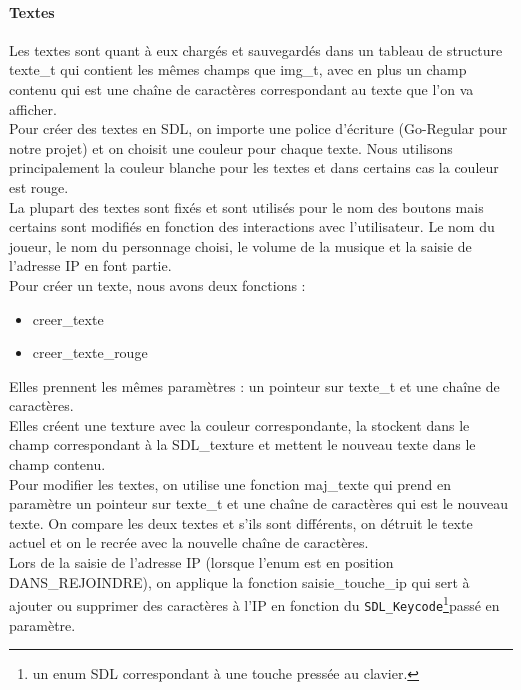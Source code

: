 \documentclass[11pt]{article}
\begin{document}
                \paragraph{Textes}\leavevmode\newline
                Les textes sont quant à eux chargés et sauvegardés dans un tableau de structure texte\_t qui contient les mêmes champs que img\_t, avec en plus un champ contenu qui est une chaîne de caractères correspondant au texte que l’on va afficher.\\
                Pour créer des textes en SDL, on importe une police d’écriture  (Go-Regular pour notre projet) et on choisit une couleur pour chaque texte. Nous utilisons principalement la couleur blanche pour les textes et dans certains cas la couleur est rouge.\\
                La plupart des textes sont fixés et sont utilisés pour le nom des boutons mais certains sont modifiés en fonction des interactions avec l’utilisateur. Le nom du joueur, le nom du personnage choisi, le volume de la musique et la saisie de l’adresse IP en font partie. \\
                Pour créer un texte, nous avons deux fonctions : 
                \begin{itemize}
                    \item creer\_texte
                    \item creer\_texte\_rouge
                \end{itemize}
                Elles prennent les mêmes paramètres : un pointeur sur texte\_t et une chaîne de caractères.\\
                Elles créent une texture avec la couleur correspondante, la stockent dans le champ correspondant à la SDL\_texture et mettent le nouveau texte dans le  champ contenu.\\
                Pour modifier les textes, on utilise une fonction maj\_texte qui prend en paramètre un pointeur sur texte\_t et une chaîne de caractères qui est le nouveau texte. On compare les deux textes et s'ils sont différents, on détruit le texte actuel et on le recrée avec la nouvelle chaîne de caractères. \\
                Lors de la saisie de l’adresse IP (lorsque l’enum est en position DANS\_REJOINDRE), on applique la fonction saisie\_touche\_ip qui sert à ajouter ou supprimer des caractères à l’IP en fonction du \texttt{SDL\_Keycode}\footnote{un enum SDL correspondant à une touche pressée au clavier.}passé en paramètre.\\
\end{document}
